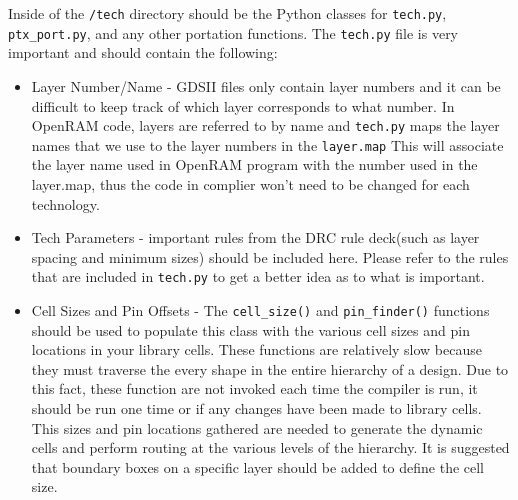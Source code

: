 Inside of the \verb|/tech| directory should be the Python classes for \verb|tech.py|,
\verb|ptx_port.py|, and any other portation functions.  The \verb|tech.py| file is very important and should contain the following:
\begin{itemize}
\item Layer Number/Name - GDSII files only contain layer numbers and it can be difficult to keep track of which layer corresponds to what number.  In OpenRAM code, layers are referred to by name and \verb|tech.py| maps the layer names that we use to the layer numbers in the \verb|layer.map|  This will associate the layer name used in OpenRAM program with the number used in the layer.map, thus the code in complier won’t need to be changed for each technology.
\item Tech Parameters - important rules from the DRC rule deck(such as layer spacing and minimum sizes) should be included here.  Please refer to the rules that are included in \verb|tech.py| to get a better idea as to what is important.
\item Cell Sizes and Pin Offsets - The \verb|cell_size()| and \verb|pin_finder()| functions should be used to populate this class with the various cell sizes and pin locations in your library cells.  These functions are relatively slow because they must traverse the every shape in the entire hierarchy of a design.  Due to this fact, these function are not invoked each time the compiler is run, it should be run one time or if any changes have been made to library cells. This sizes and pin locations gathered are needed to generate the dynamic cells and perform routing at the various levels of the hierarchy.  It is suggested that boundary boxes on a specific layer should be added to define the cell size.
\end{itemize}






